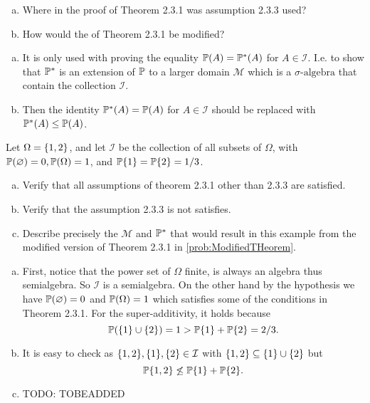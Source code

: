 \begin{problem}
	\label{prob:ModifiedTHeorem}
	\begin{enumerate}[(a)]
		\item Where in the proof of Theorem 2.3.1 was assumption 2.3.3 used?
		\item How would the  of Theorem 2.3.1 be modified?
	\end{enumerate}
\end{problem}
\begin{solution}
	\begin{enumerate}[(a)]
		\item It is only used with proving the equality $ \mathbb{P}(A) = \mathbb{P}^*(A) $ for $ A \in \mathcal{I} $. I.e. to show that $ \mathbb{P}^* $ is an extension of $ \mathbb{P} $ to a larger domain $ \mathcal{M} $ which is a $\sigma\text{-algebra}$ that contain the collection $ \mathcal{I} $.
		\item Then the identity $ \mathbb{P}^*(A) = \mathbb{P}(A) $ for $ A \in \mathcal{I} $ should be replaced with $ \mathbb{P}^*(A) \leq \mathbb{P}(A) $.
 	\end{enumerate}
\end{solution}

\begin{problem}
	Let $ \Omega=\{1,2\} $, and let $ \mathcal{I} $ be the collection of all subsets of $ \Omega $, with $ \mathbb{P}(\varnothing)=0, \mathbb{P}(\Omega) = 1 $, and $ \mathbb{P}\{1\}=\mathbb{P}\{2\} = 1/3 $.
	\begin{enumerate}[(a)]
		\item Verify that all assumptions of theorem 2.3.1 other than 2.3.3 are satisfied.
		\item Verify that the assumption 2.3.3 is not satisfies.
		\item Describe precisely the $ \mathcal{M} $ and $ \mathbb{P}^* $ that would result in this example from the modified version of Theorem 2.3.1 in \autoref{prob:ModifiedTHeorem}.
	\end{enumerate}
\end{problem}
\begin{solution}
	\begin{enumerate}[(a)]
		\item First, notice that the power set of $ \Omega $ finite, is always an algebra thus semialgebra. So $ \mathcal{I} $ is a semialgebra. On the other hand by the hypothesis we have $ \mathbb{P}(\varnothing) = 0 $ and $ \mathbb{P}(\Omega) = 1 $ which satisfies some of the conditions in Theorem 2.3.1. For the super-additivity, it holds because 
		\[ \mathbb{P}(\{1\}\cup\{2\}) = 1 > \mathbb{P}\{1\} + \mathbb{P}\{2\} = 2/3. \]
		\item It is easy to check as $ \{1,2\},\{1\},\{2\} \in \mathcal{I} $ with $ \{1,2\} \subseteq \{1\}\cup \{2\} $ but
		\[ \mathbb{P}\{1,2\} \not\leq \mathbb{P}\{1\}+\mathbb{P}\{2\}.\]
		\item {\color{red} \noindent TODO: TOBEADDED}
	\end{enumerate}
\end{solution}





\newpage
